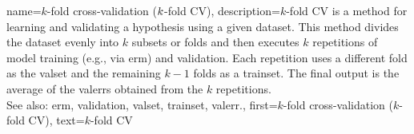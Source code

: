{name={$k$-fold cross-validation ($k$-fold CV)},
	description={$k$-fold CV is a 
		method for learning and validating a \gls{hypothesis} using a given \gls{dataset}. 
		This method divides the \gls{dataset} evenly into $k$ subsets or folds 
		and then executes $k$ repetitions of \gls{model} training (e.g., via \gls{erm}) and \gls{validation}. 
		Each repetition uses a different fold as the \gls{valset} and the remaining $k-1$ folds 
		as a \gls{trainset}. The final output is the average of the \glspl{valerr} obtained 
		from the $k$ repetitions.
				\\
		See also: \gls{erm}, \gls{validation}, \gls{valset}, \gls{trainset}, \gls{valerr}.},
		first={$k$-fold cross-validation ($k$-fold CV)},
		text={$k$-fold CV}
}

